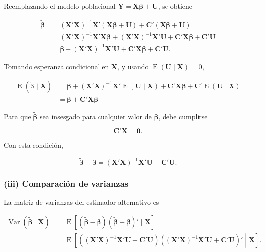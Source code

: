 \documentclass[11pt,a4paper]{article}
\DeclareMathOperator{\E}{E}
\DeclareMathOperator{\Var}{Var}
\begin{document}
Reemplazando el modelo poblacional \(\mathbf{Y}=\mathbf{X}\boldsymbol{\beta}+\mathbf{U}\), se obtiene

\begin{align*}
\tilde{\boldsymbol{\beta}}
&=(\mathbf{X}'\mathbf{X})^{-1}\mathbf{X}'(\mathbf{X}\boldsymbol{\beta}+\mathbf{U})
+\mathbf{C}'(\mathbf{X}\boldsymbol{\beta}+\mathbf{U}) \\
&=(\mathbf{X}'\mathbf{X})^{-1}\mathbf{X}'\mathbf{X}\boldsymbol{\beta}
+(\mathbf{X}'\mathbf{X})^{-1}\mathbf{X}'\mathbf{U}
+\mathbf{C}'\mathbf{X}\boldsymbol{\beta}+\mathbf{C}'\mathbf{U} \\
&=\boldsymbol{\beta}+(\mathbf{X}'\mathbf{X})^{-1}\mathbf{X}'\mathbf{U}
+\mathbf{C}'\mathbf{X}\boldsymbol{\beta}+\mathbf{C}'\mathbf{U}.
\end{align*}

Tomando esperanza condicional en \(\mathbf{X}\), y usando \(\E(\mathbf{U}\mid\mathbf{X})=\mathbf{0}\),

\begin{align*}
\E(\tilde{\boldsymbol{\beta}}\mid\mathbf{X})
&=\boldsymbol{\beta}
+(\mathbf{X}'\mathbf{X})^{-1}\mathbf{X}'\E(\mathbf{U}\mid\mathbf{X})
+\mathbf{C}'\mathbf{X}\boldsymbol{\beta}
+\mathbf{C}'\E(\mathbf{U}\mid\mathbf{X}) \\
&=\boldsymbol{\beta}+\mathbf{C}'\mathbf{X}\boldsymbol{\beta}.
\end{align*}

Para que \(\tilde{\boldsymbol{\beta}}\) sea insesgado para cualquier valor de \(\boldsymbol{\beta}\), debe cumplirse

\begin{resultado}
\[
\boxed{\mathbf{C}'\mathbf{X}=\mathbf{0}}.
\]
\end{resultado}

Con esta condición,

\[
\tilde{\boldsymbol{\beta}}-\boldsymbol{\beta}
=(\mathbf{X}'\mathbf{X})^{-1}\mathbf{X}'\mathbf{U}+\mathbf{C}'\mathbf{U}.
\]

\subsubsection*{(iii) Comparación de varianzas}

La matriz de varianzas del estimador alternativo es

\begin{align*}
\Var(\tilde{\boldsymbol{\beta}}\mid\mathbf{X})
&=\E\left[(\tilde{\boldsymbol{\beta}}-\boldsymbol{\beta})
(\tilde{\boldsymbol{\beta}}-\boldsymbol{\beta})'\mid\mathbf{X}\right] \\
&=\E\left[\left((\mathbf{X}'\mathbf{X})^{-1}\mathbf{X}'\mathbf{U}+\mathbf{C}'\mathbf{U}\right)
\left((\mathbf{X}'\mathbf{X})^{-1}\mathbf{X}'\mathbf{U}+\mathbf{C}'\mathbf{U}\right)'\middle|\mathbf{X}\right].
\end{align*}
\end{document}
